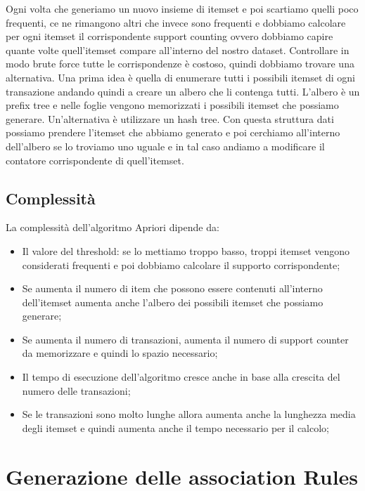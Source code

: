 \documentclass[14pt]{extreport}
\begin{document}
Ogni volta che generiamo un nuovo insieme di itemset e poi scartiamo quelli poco frequenti, ce ne rimangono altri che invece sono frequenti e dobbiamo calcolare per ogni itemset il corrispondente support counting ovvero dobbiamo capire quante volte quell'itemset compare all'interno del nostro dataset.
Controllare in modo brute force tutte le corrispondenze è costoso, quindi dobbiamo trovare una alternativa.
Una prima idea è quella di enumerare tutti i possibili itemset di ogni transazione andando quindi a creare un albero che li contenga tutti. L'albero è un prefix tree e nelle foglie vengono memorizzati i possibili itemset che possiamo generare. Un'alternativa è utilizzare un hash tree.
Con questa struttura dati possiamo prendere l'itemset che abbiamo generato e poi cerchiamo all'interno dell'albero se lo troviamo uno uguale e in tal caso andiamo a modificare il contatore corrispondente di quell'itemset.

\subsection{Complessità}

La complessità dell'algoritmo Apriori dipende da:

\begin{itemize}
    \item Il valore del threshold: se lo mettiamo troppo basso, troppi itemset vengono considerati frequenti e poi dobbiamo calcolare il supporto corrispondente;
    \item Se aumenta il numero di item che possono essere contenuti all'interno dell'itemset aumenta anche l'albero dei possibili itemset che possiamo generare;
    \item Se aumenta il numero di transazioni, aumenta il numero di support counter da memorizzare e quindi lo spazio necessario;
    \item Il tempo di esecuzione dell'algoritmo cresce anche in base alla crescita del numero delle transazioni;
    \item Se le transazioni sono molto lunghe allora aumenta anche la lunghezza media degli itemset e quindi aumenta anche il tempo necessario per il calcolo;
\end{itemize}

\section{Generazione delle association Rules}
\end{document}
